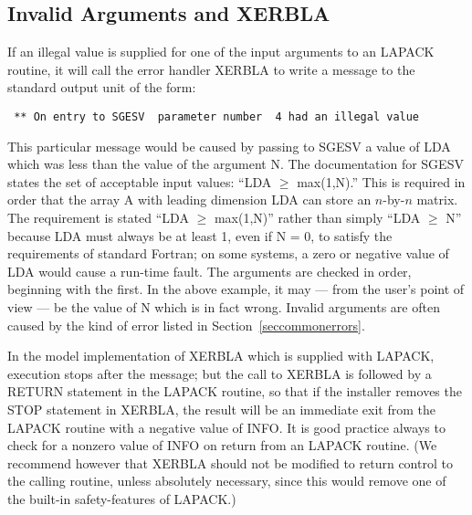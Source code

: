 \subsection{Invalid Arguments and XERBLA}
If an illegal value is supplied for one of the input arguments to
an LAPACK routine, it will call the error handler XERBLA to write
a message to the standard output unit of the form:
\begin{verbatim}
 ** On entry to SGESV  parameter number  4 had an illegal value
\end{verbatim}
This particular message would be caused by passing to SGESV a value of LDA 
which was less than the value of the argument N.
The documentation for SGESV states the set of acceptable input values:
``LDA $\geq$ max(1,N).'' This is required in order that the
array A with leading dimension LDA can store an $n$-by-$n$ 
matrix.
The requirement is stated ``LDA $\geq$ max(1,N)'' 
rather than simply
``LDA $\geq$ N'' because LDA must always be at least 1, even if N = 0, 
to satisfy the 
requirements of standard Fortran; on some systems,
a zero or negative value of LDA would cause a run-time fault.
The arguments are checked in order, beginning with the first.
In the above example, it may --- from the user's point of view --- be the
value of N which is in fact wrong. 
Invalid arguments are often caused by the kind of error listed in 
Section~\ref{seccommonerrors}.

In the model implementation of XERBLA which is supplied with LAPACK,
execution stops after the
message; but the call to XERBLA is followed by a RETURN statement
in the LAPACK routine, so that if the installer removes the
STOP statement in XERBLA, the result will be an immediate exit from the
LAPACK routine with a negative value of INFO.
It is good practice always to check for a nonzero value of INFO
on return from an LAPACK routine.
(We recommend however that XERBLA should not be modified to return control
to the calling routine, unless absolutely
necessary, since this would remove one of the built-in safety-features
of LAPACK.)


